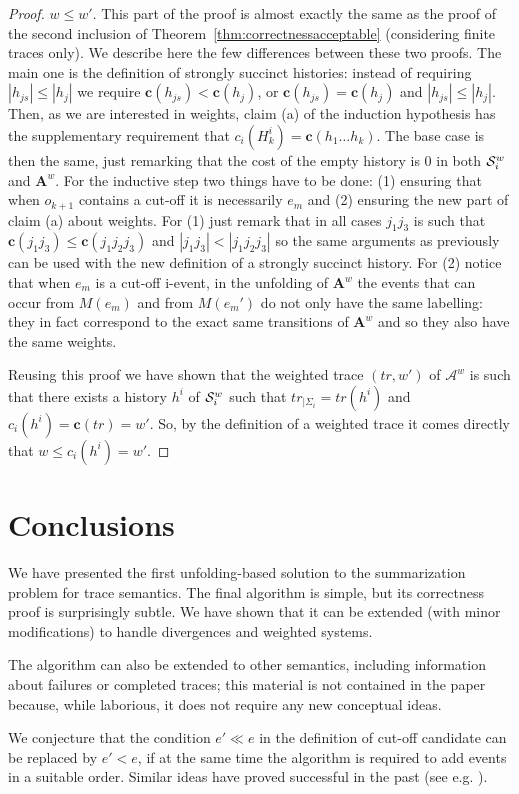 \documentclass{llncs}
\def\A{\mathcal{A}}
\def\prod{\mathbf{A}}
\def\S{\mathcal{S}}
\def\scause{\ll}
\renewcommand{\S}{{\cal S}}
\def\trace{tr}
\begin{document}
\begin{proof}
$w\leq w'$.
This part of the proof is almost exactly the same as the proof of the second inclusion of Theorem~\ref{thm:correctnessacceptable} (considering finite traces only).
We describe here the few differences between these two proofs.
The main one is the definition of strongly succinct histories: instead of requiring $|h_{js}|\leq|h_j|$ we require $\mathbf{c}(h_{js})<\mathbf{c}(h_j)$, or $\mathbf{c}(h_{js})=\mathbf{c}(h_j)$ and $|h_{js}|\leq|h_j|$.
Then, as we are interested in weights, claim (a) of the induction hypothesis has the supplementary requirement that $c_i(H_k^i)=\mathbf{c}(h_1\dots h_k)$.
The base case is then the same, just remarking that the cost of the empty history is $0$ in both $\S_i^w$ and $\prod^w$. 
For the inductive step two things have to be done: (1) ensuring that when $o_{k+1}$ contains a cut-off it is necessarily $e_m$ and (2) ensuring the new part of claim (a) about weights.
For (1) just remark that in all cases $j_1j_3$ is such that $\mathbf{c}(j_1j_3)\leq \mathbf{c}(j_1j_2j_3)$ and $|j_1j_3|<|j_1j_2j_3|$ so the same arguments as previously can be used with the new definition of a strongly succinct history.
For (2) notice that when $e_m$ is a cut-off i-event, in the unfolding of $\prod^w$ the events that can occur from $M(e_m)$ and from $M(e_m')$ do not only have the same labelling: they in fact correspond to the exact same transitions of $\prod^w$ and so they also have the same weights.

Reusing this proof we have shown that the weighted trace $(\trace,w')$ of $\A^w$ is such that there exists a history $h^i$ of $\S_i^w$ such that $\trace_{|\Sigma_i}=\trace(h^i)$ and $c_i(h^i)=\mathbf{c}(\trace)=w'$.
So, by the definition of a weighted trace it comes directly that $w\leq c_i(h^i) = w'$.
\end{proof}


\section{Conclusions}

We have presented the first unfolding-based solution to the 
summarization problem for trace semantics. The final algorithm is 
simple, but its correctness proof is surprisingly subtle. 
We have shown that it can be extended (with minor modifications) to handle divergences and weighted systems.

The algorithm can also be extended to other semantics,
including information about failures or completed traces;
this material is not contained in the paper because, while laborious,
it does not require any new conceptual ideas. 

We conjecture that the condition $e' \scause e$ in the definition 
of cut-off candidate 
can be replaced by $e' < e$, if at the same time the algorithm is 
required to add events 
in a suitable order. Similar ideas have proved successful in the past 
(see e.g. \cite{Esparza96,Khomenko03}).




\end{document}
